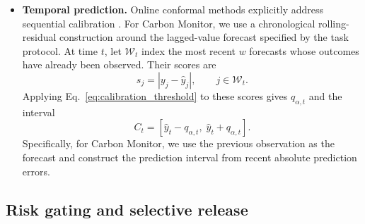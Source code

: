 \documentclass[preprint,12pt,authoryear]{elsarticle}
\begin{document}
\begin{itemize}
    A correctness scorer, trained on a separate scorer-training split
    and then frozen, produces \(r_i\in[0,1]\) from the observable task
    category and the generated selections. Calibration uses
    \begin{equation}
        s_i
        =
        Z_i(1-r_i)+(1-Z_i)r_i,
        \label{eq:statqa_nonconformity}
    \end{equation}
    yielding the correctness set
    \begin{equation}
        C_i
        =
        \left\{
            z\in\{0,1\}:
            z(1-r_i)+(1-z)r_i\leq\widehat q_\alpha
        \right\}.
        \label{eq:statqa_correctness_set}
    \end{equation}
    Reference answers supply offline training and calibration labels
    but are excluded from the scorer's inputs when assessing a new
    candidate. Thus, the calibrated target concerns the benchmark's
    structured analytical choices rather than unrestricted
    natural-language factuality.

    \item \textbf{Temporal prediction.}
    Online conformal methods explicitly address sequential calibration
    \citep{angelopoulos2024online}. For Carbon Monitor, we use a
    chronological rolling-residual construction around the lagged-value
    forecast specified by the task protocol. At time \(t\), let
    \(\mathcal{W}_t\) index the most recent \(w\) forecasts whose
    outcomes have already been observed. Their scores are
    \begin{equation}
        s_j
        =
        \left|y_j-\widehat y_j\right|,
        \qquad j\in\mathcal{W}_t.
        \label{eq:rolling_residual_scores}
    \end{equation}
    Applying Eq.~\eqref{eq:calibration_threshold} to these scores
    gives \(q_{\alpha,t}\) and the interval
    \begin{equation}
        C_t
        =
        \left[
            \widehat y_t-q_{\alpha,t},\;
            \widehat y_t+q_{\alpha,t}
        \right].
        \label{eq:rolling_calibrated_interval}
    \end{equation}
    Specifically, for Carbon Monitor, we use the previous observation as the forecast and construct the prediction interval from recent absolute prediction errors.

\end{itemize}



\subsection{Risk gating and selective release}
\label{sec:risk_gating}
\end{document}
